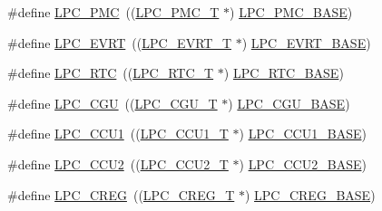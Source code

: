 \begin{DoxyCompactItemize}
\item 
\#define \hyperlink{group___p_e_r_i_p_h__18_x_x___b_a_s_e_ga57d17d4e060482184443625602b43b7d}{L\+P\+C\+\_\+\+P\+MC}~((\hyperlink{struct_l_p_c___p_m_c___t}{L\+P\+C\+\_\+\+P\+M\+C\+\_\+T}              $\ast$) \hyperlink{group___p_e_r_i_p_h__43_x_x___b_a_s_e_gad729bfbe3e327b259732dd0817d6e34b}{L\+P\+C\+\_\+\+P\+M\+C\+\_\+\+B\+A\+SE})
\item 
\#define \hyperlink{group___p_e_r_i_p_h__18_x_x___b_a_s_e_gaaf88f3cc7e8fe79bf75ead9e481ce650}{L\+P\+C\+\_\+\+E\+V\+RT}~((\hyperlink{struct_l_p_c___e_v_r_t___t}{L\+P\+C\+\_\+\+E\+V\+R\+T\+\_\+T}             $\ast$) \hyperlink{group___p_e_r_i_p_h__43_x_x___b_a_s_e_ga921b2ba31c8defad6d1c44ca9406e893}{L\+P\+C\+\_\+\+E\+V\+R\+T\+\_\+\+B\+A\+SE})
\item 
\#define \hyperlink{group___p_e_r_i_p_h__18_x_x___b_a_s_e_ga8303d3e5135b2a039f0dc5f93c194f78}{L\+P\+C\+\_\+\+R\+TC}~((\hyperlink{struct_l_p_c___r_t_c___t}{L\+P\+C\+\_\+\+R\+T\+C\+\_\+T}              $\ast$) \hyperlink{group___p_e_r_i_p_h__43_x_x___b_a_s_e_ga4618213cf968f8245814d7d3e7aa2e2e}{L\+P\+C\+\_\+\+R\+T\+C\+\_\+\+B\+A\+SE})
\item 
\#define \hyperlink{group___p_e_r_i_p_h__18_x_x___b_a_s_e_ga38d60a5a3029e4ebc3c5ffcd856a828d}{L\+P\+C\+\_\+\+C\+GU}~((\hyperlink{struct_l_p_c___c_g_u___t}{L\+P\+C\+\_\+\+C\+G\+U\+\_\+T}              $\ast$) \hyperlink{group___p_e_r_i_p_h__43_x_x___b_a_s_e_ga560da3a74764a9e89bef655f3daa8b0e}{L\+P\+C\+\_\+\+C\+G\+U\+\_\+\+B\+A\+SE})
\item 
\#define \hyperlink{group___p_e_r_i_p_h__18_x_x___b_a_s_e_ga7af049d852c4cd543c025d95b1237ddd}{L\+P\+C\+\_\+\+C\+C\+U1}~((\hyperlink{struct_l_p_c___c_c_u1___t}{L\+P\+C\+\_\+\+C\+C\+U1\+\_\+T}             $\ast$) \hyperlink{group___p_e_r_i_p_h__43_x_x___b_a_s_e_gaf7df220ef74f9e793259c495db5e5956}{L\+P\+C\+\_\+\+C\+C\+U1\+\_\+\+B\+A\+SE})
\item 
\#define \hyperlink{group___p_e_r_i_p_h__18_x_x___b_a_s_e_ga8e34c6693a17476d7e908fff3b9b6052}{L\+P\+C\+\_\+\+C\+C\+U2}~((\hyperlink{struct_l_p_c___c_c_u2___t}{L\+P\+C\+\_\+\+C\+C\+U2\+\_\+T}             $\ast$) \hyperlink{group___p_e_r_i_p_h__43_x_x___b_a_s_e_gab3b7e06c5e7e1913c555e584e2092f21}{L\+P\+C\+\_\+\+C\+C\+U2\+\_\+\+B\+A\+SE})
\item 
\#define \hyperlink{group___p_e_r_i_p_h__18_x_x___b_a_s_e_gae0cf72a5b1a46bb8d426837a1d38804a}{L\+P\+C\+\_\+\+C\+R\+EG}~((\hyperlink{struct_l_p_c___c_r_e_g___t}{L\+P\+C\+\_\+\+C\+R\+E\+G\+\_\+T}             $\ast$) \hyperlink{group___p_e_r_i_p_h__43_x_x___b_a_s_e_ga862ac15bfc87b2a8525acacccedfba61}{L\+P\+C\+\_\+\+C\+R\+E\+G\+\_\+\+B\+A\+SE})

\end{DoxyCompactItemize}

